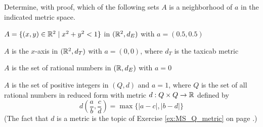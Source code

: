 
\be

\item Determine, with proof, which of the following sets $A$ is a neighborhood of $a$ in the indicated metric space. 

\ba

\item $A = \{(x,y) \in \mathbb{R}^2 \mid x^2+y^2 < 1\}$ in $(\mathbb{R}^2,d_E)$ with $a = (0.5,0.5)$

\item $A$ is the $x$-axis in $(\mathbb{R}^2,d_T)$ with $a =(0,0)$, where $d_T$ is the taxicab metric

\item $A$ is the set of rational numbers in $(\mathbb{R}, d_E)$ with $a = 0$

\item $A$ is the set of positive integers in $(Q,d)$ and $a = 1$, where $Q$ is the set of all rational numbers in reduced form with metric $d : Q \times Q \to \mathbb{R}$ defined by 
\[d\left(\frac{a}{b}, \frac{c}{d}\right) = \max\{| a-c |, | b-d |\}\]
(The fact that $d$ is a metric is the topic of Exercise \ref{ex:MS_Q_metric} on page \pageref{ex:MS_Q_metric}.)


\ea

\begin{comment}

\ExerciseSolution

\ba

\item Since $A = B((0,0),1)$ and we know that every open ball is a neighborhood of each of its points, we conclude that $A$ is a neighborhood of $a$. 

\item Let $\delta$ be a positive real number and consider the open ball $B(a, \delta)$ in $(\R^2,d_T)$. The point $\left(0, \frac{\delta}{2}\right)$ is in $B(a,\delta)$ but not in $A$. So $A$ cannot contain any open ball centered at $a$. We conclude that $A$ is not a neighborhood of $a$.  

\item Exercise \ref{ex:GLB_irrational} on page \pageref{ex:GLB_irrational} tells us that there is an irrational number between any two real numbers. So there are irrational numbers in any interval of the form $(a - \delta, a+\delta)$ for any $\delta > 0$. We conclude that $A$ is not a neighborhood of $a$. 

\item Consider the ball $B(a,1)$ in $Q$. An element $\frac{p}{q}$ is in $B(a,1)$ if 
\[d\left(\frac{1}{1}, \frac{p}{q}\right) = \max\{| 1-p |, | 1-q |\} < 1.\]
This can only happen if $|1-p| < 1$ and $|1-q| < 1$. But $p$ and $q$ are integers, so we must have $p = q = 1$. Thus, $B(a,1) = \{a\}$. So any set that contains $a$ in $Q$ contains $B(a,1)$. We conclude that any set that contains $a$ is a neighborhood of $a$.   

\ea

\end{comment}


